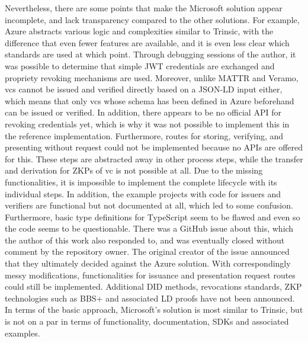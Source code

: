     Nevertheless, there are some points that make the Microsoft solution appear incomplete, and lack transparency compared to the other solutions. For example, Azure abstracts various logic and complexities similar to Trinsic, with the difference that even fewer features are available, and it is even less clear which standards are used at which point. Through debugging sessions of the author, it was possible to determine that simple JWT credentials are exchanged and propriety revoking mechanisms are used. Moreover, unlike MATTR and Veramo, \acp{vc} cannot be issued and verified directly based on a JSON-LD input either, which means that only \acp{vc} whose schema has been defined in Azure beforehand can be issued or verified. In addition, there appears to be no official API for revoking credentials yet, which is why it was not possible to implement this in the reference implementation. Furthermore, routes for storing, verifying, and presenting without request could not be implemented because no APIs are offered for this. These steps are abstracted away in other process steps, while the transfer and derivation for ZKPs of \ac{vc} is not possible at all. Due to the missing functionalities, it is impossible to implement the complete lifecycle with its individual steps. In addition, the example projects with code for issuers and verifiers are functional but not documented at all, which led to some confusion. Furthermore, basic type definitions for TypeScript seem to be flawed and even so the code seems to be questionable. There was a GitHub issue about this, which the author of this work also responded to, and was eventually closed without comment by the repository owner. The original creator of the issue announced that they ultimately decided against the Azure solution. With correspondingly messy modifications, functionalities for issuance and presentation request routes could still be implemented. Additional \ac{DID} methods, revocations standards, ZKP technologies such as BBS+ and associated LD proofs have not been announced. In terms of the basic approach, Microsoft's solution is most similar to Trinsic, but is not on a par in terms of functionality, documentation, SDKs and associated examples.

